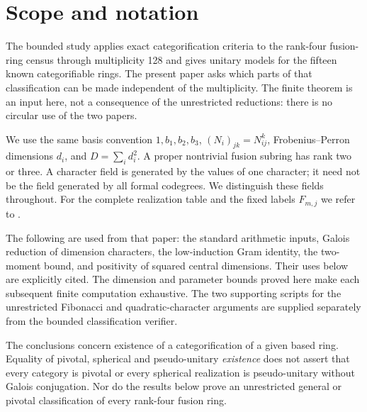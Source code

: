 \section{Scope and notation}
The bounded study \cite{Finite} applies exact categorification criteria
to the rank-four fusion-ring census through multiplicity 128 and gives
unitary models for the fifteen known categorifiable rings.
The present paper asks which parts of that classification can be made
independent of the multiplicity. The finite theorem is an input here,
not a consequence of the unrestricted reductions: there is no circular
use of the two papers.

We use the same basis convention $1,b_1,b_2,b_3$,
$(N_i)_{jk}=N_{ij}^k$, Frobenius--Perron dimensions $d_i$, and
$D=\sum_i d_i^2$. A proper nontrivial fusion subring has rank two or
three. A character field is generated by the values of one character;
it need not be the field generated by all formal codegrees. We distinguish
these fields throughout. For the complete realization table and the fixed
labels $F_{m,j}$ we refer to \cite{Finite}.

The following are used from that paper: the standard arithmetic inputs,
Galois reduction of dimension characters, the low-induction Gram identity,
the two-moment bound, and positivity of squared central dimensions.
Their uses below are explicitly cited. The dimension and parameter bounds
proved here make each subsequent finite computation exhaustive. The two
supporting scripts for the unrestricted Fibonacci and quadratic-character
arguments are supplied separately from the bounded classification verifier.

The conclusions concern existence of a categorification of a given based
ring. Equality of pivotal, spherical and pseudo-unitary \emph{existence}
does not assert that every category is pivotal or every spherical
realization is pseudo-unitary without Galois conjugation. Nor do the results
below prove an unrestricted general or pivotal classification of every
rank-four fusion ring.
